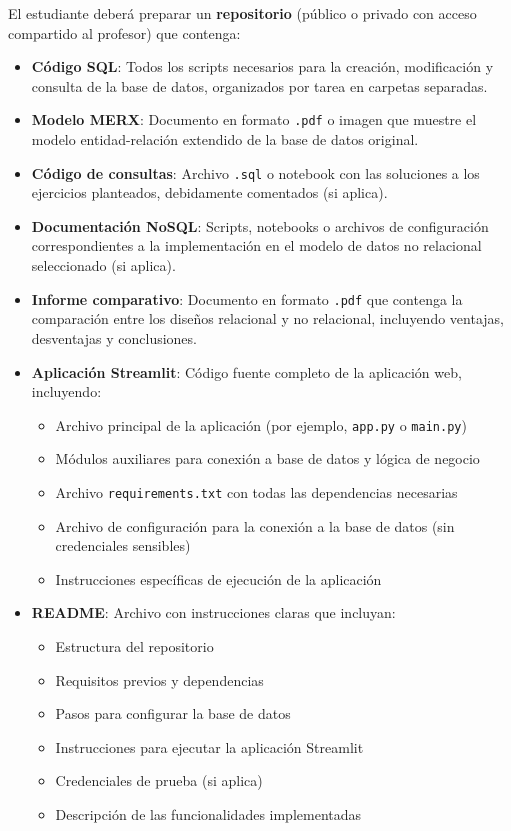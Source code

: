 \documentclass[10pt]{article}
\begin{document}
	El estudiante deberá preparar un \textbf{repositorio} (público o privado con acceso compartido al profesor) que contenga:
	
	\begin{itemize}
		\item \textbf{Código SQL}: Todos los scripts necesarios para la creación, modificación y consulta de la base de datos, organizados por tarea en carpetas separadas.
		
		\item \textbf{Modelo MERX}: Documento en formato \texttt{.pdf} o imagen que muestre el modelo entidad-relación extendido de la base de datos original.
		
		\item \textbf{Código de consultas}: Archivo \texttt{.sql} o notebook con las soluciones a los ejercicios planteados, debidamente comentados (si aplica).
		
		\item \textbf{Documentación NoSQL}: Scripts, notebooks o archivos de configuración correspondientes a la implementación en el modelo de datos no relacional seleccionado (si aplica).
		
		\item \textbf{Informe comparativo}: Documento en formato \texttt{.pdf} que contenga la comparación entre los diseños relacional y no relacional, incluyendo ventajas, desventajas y conclusiones.
		
		\item \textbf{Aplicación Streamlit}: Código fuente completo de la aplicación web, incluyendo:
		\begin{itemize}
			\item Archivo principal de la aplicación (por ejemplo, \texttt{app.py} o \texttt{main.py})
			\item Módulos auxiliares para conexión a base de datos y lógica de negocio
			\item Archivo \texttt{requirements.txt} con todas las dependencias necesarias
			\item Archivo de configuración para la conexión a la base de datos (sin credenciales sensibles)
			\item Instrucciones específicas de ejecución de la aplicación
		\end{itemize}
		
		\item \textbf{README}: Archivo con instrucciones claras que incluyan:
		\begin{itemize}
			\item Estructura del repositorio
			\item Requisitos previos y dependencias
			\item Pasos para configurar la base de datos
			\item Instrucciones para ejecutar la aplicación Streamlit
			\item Credenciales de prueba (si aplica)
			\item Descripción de las funcionalidades implementadas
		\end{itemize}
		

\end{itemize}
\end{document}
